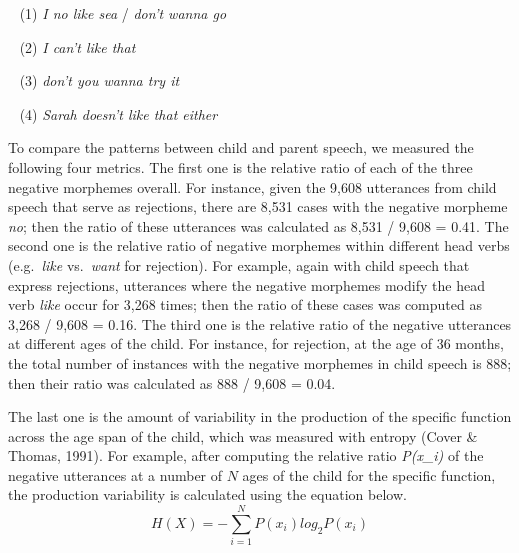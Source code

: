 \documentclass[10pt, letterpaper]{article}
\begin{document}
~ (1) \emph{I no like sea} / \emph{don't wanna go}

~ (2) \emph{I can't like that}

~ (3) \emph{don't you wanna try it}

~ (4) \emph{Sarah doesn't like that either}

To compare the patterns between child and parent speech, we measured the
following four metrics. The first one is the relative ratio of each of
the three negative morphemes overall. For instance, given the 9,608
utterances from child speech that serve as rejections, there are 8,531
cases with the negative morpheme \emph{no}; then the ratio of these
utterances was calculated as 8,531 / 9,608 = 0.41. The second one is the
relative ratio of negative morphemes within different head verbs
(e.g.~\emph{like} vs.~\emph{want} for rejection). For example, again
with child speech that express rejections, utterances where the negative
morphemes modify the head verb \emph{like} occur for 3,268 times; then
the ratio of these cases was computed as 3,268 / 9,608 = 0.16. The third
one is the relative ratio of the negative utterances at different ages
of the child. For instance, for rejection, at the age of 36 months, the
total number of instances with the negative morphemes in child speech is
888; then their ratio was calculated as 888 / 9,608 = 0.04.

The last one is the amount of variability in the production of the
specific function across the age span of the child, which was measured
with entropy (Cover \& Thomas, 1991). For example, after computing the
relative ratio \emph{P(x\_i)} of the negative utterances at a number of
\(N\) ages of the child for the specific function, the production
variability is calculated using the equation below. \begin{equation}
H(X) = -\sum_{i=1}^N P(x_i)log_2P(x_i) 
\end{equation}
\end{document}
